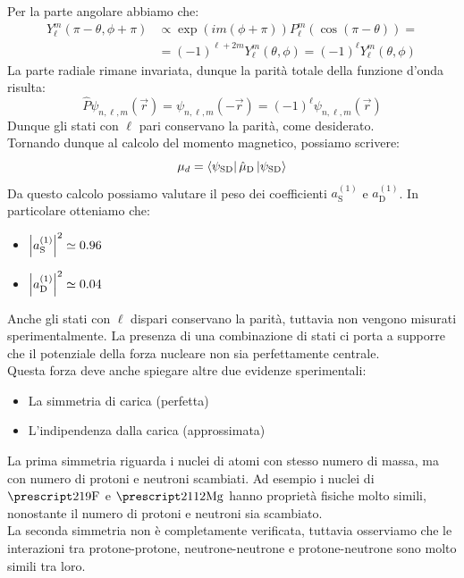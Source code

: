 Per la parte angolare abbiamo che:
\begin{equation}
 \begin{split}
    Y_{\ell}^{m}(\pi - \theta, \phi + \pi) &\propto \exp(i m (\phi + \pi)) P_{\ell}^{m}(\cos(\pi - \theta)) =\\[8pt]
    &= (-1)^{\ell + 2m} Y_{\ell}^{m}(\theta, \phi) = (-1)^\ell Y_{\ell}^{m}(\theta, \phi)
 \end{split}
\end{equation}
La parte radiale rimane invariata, dunque la parità totale della funzione d'onda risulta:
\begin{equation}
 \hat{P}\psi_{n,\ell,m}(\vec{r}) = \psi_{n,\ell,m}(-\vec{r}) = (-1)^\ell \psi_{n,\ell,m}(\vec{r})
\end{equation}
Dunque gli stati con $\ell$ pari conservano la parità, come desiderato.\\
Tornando dunque al calcolo del momento magnetico, possiamo scrivere:
\begin{equation}
  \mu_d = \bra{\psi_{\text{SD}}} \hat{\mu}_{\text{D}} \ket{\psi_{\text{SD}}}
 \end{equation}
Da questo calcolo possiamo valutare il peso dei coefficienti $a_{\text{S}}^{(1)}$ e $a_{\text{D}}^{(1)}$. In particolare otteniamo che:
\begin{itemize}
  \item $\abs{a_{\text{S}}^{(1)}}^2 \simeq 0.96$
  \item $\abs{a_{\text{D}}^{(1)}}^2 \simeq 0.04$
\end{itemize}
Anche gli stati con $\ell$ dispari conservano la parità, tuttavia non vengono misurati sperimentalmente. La presenza di una combinazione di stati ci porta a supporre che il potenziale della forza nucleare non sia perfettamente centrale.\\
Questa forza deve anche spiegare altre due evidenze sperimentali:
\begin{itemize}
 \item La simmetria di carica (perfetta)
 \item L'indipendenza dalla carica (approssimata)
\end{itemize}
La prima simmetria riguarda i nuclei di atomi con stesso numero di massa, ma con numero di protoni e neutroni scambiati. Ad esempio i nuclei di $\atom{F}{21}{9}$ e $\atom{Mg}{21}{12}$ hanno proprietà fisiche molto simili, nonostante il numero di protoni e neutroni sia scambiato.\\
La seconda simmetria non è completamente verificata, tuttavia osserviamo che le interazioni tra protone-protone, neutrone-neutrone e protone-neutrone sono molto simili tra loro.

